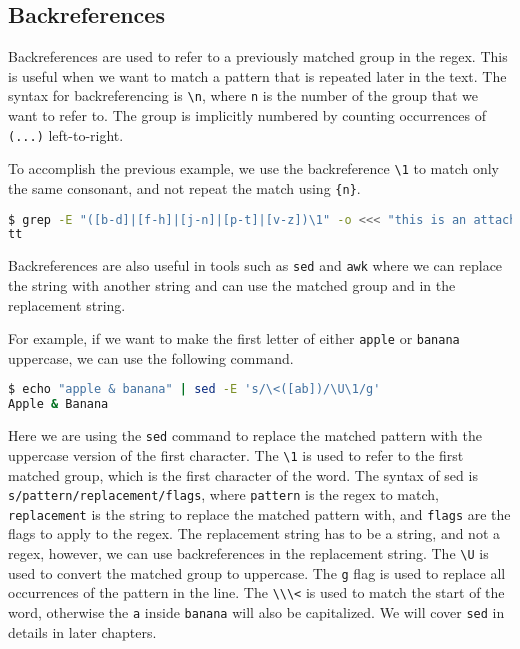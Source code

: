 \subsection{Backreferences}

Backreferences are used to refer to a previously matched group in the regex. This is useful when we want to match a pattern that is repeated later in the text. The syntax for backreferencing is \lstinline|\n|, where \lstinline|n| is the number of the group that we want to refer to. The group is implicitly numbered by counting occurrences of \lstinline|(...)| left-to-right.

To accomplish the previous example, we use the backreference \lstinline|\1| to match only the same consonant, and not repeat the match using \lstinline|{n}|.

\begin{lstlisting}[language=bash]
$ grep -E "([b-d]|[f-h]|[j-n]|[p-t]|[v-z])\1" -o <<< "this is an attached sentence"
tt
\end{lstlisting}

Backreferences are also useful in tools such as \texttt{sed} and \texttt{awk} where we can replace the string with another string and can use the matched group and in the replacement string.

For example, if we want to make the first letter of either \lstinline|apple| or \lstinline|banana| uppercase, we can use the following command.


\begin{lstlisting}[language=bash]
$ echo "apple & banana" | sed -E 's/\<([ab])/\U\1/g'
Apple & Banana
\end{lstlisting}

Here we are using the \texttt{sed} command to replace the matched pattern with the uppercase version of the first character. The \texttt{\textbackslash 1} is used to refer to the first matched group, which is the first character of the word.
The syntax of sed is \lstinline|s/pattern/replacement/flags|, where \lstinline|pattern| is the regex to match, \lstinline|replacement| is the string to replace the matched pattern with, and \lstinline|flags| are the flags to apply to the regex.
The replacement string has to be a string, and not a regex, however, we can use backreferences in the replacement string.
The \texttt{\textbackslash U} is used to convert the matched group to uppercase.
The \texttt{g} flag is used to replace all occurrences of the pattern in the line.
The \lstinline|\\\<| is used to match the start of the word, otherwise the \lstinline|a| inside \lstinline|banana| will also be capitalized.
We will cover \lstinline|sed| in details in later chapters.

